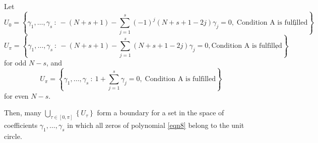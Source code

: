 \documentclass[12pt]{article}
\newcommand{\br}[1]{\left[#1\right]}
\newcommand{\cb}[1]{\left\{#1\right\}}
\begin{document}
Let
\begin{displaymath}
U_0 = \cb{\gamma_1,\ldots,\gamma_s \ : \ -(N + s + 1) - \sum_{j = 1}^{s}(-1)^j(N + s + 1 - 2j)\gamma_j = 0,\; \mbox{Condition A is fulfilled}},
\end{displaymath}
\begin{displaymath}
U_\pi = \cb{\gamma_1,\ldots,\gamma_s \ : \ -(N + s + 1) - \sum_{j = 1}^{s}(N + s + 1 - 2j)\gamma_j = 0, \mbox{Condition A is fulfilled}},
\end{displaymath}
for odd $N - s$, and
\begin{displaymath}
U_\pi = \cb{\gamma_1,\ldots,\gamma_s \ : \ 1 + \sum_{j = 1}^{s}\gamma_j = 0,\; \mbox{Condition A is fulfilled}}
\end{displaymath}
for even $N - s$.

Then, many $\displaystyle \bigcup_{\tau \in \br{0,\pi}} \cb{U_\tau}$ form a boundary for a set in the space of coefficients $\gamma_1, \ldots, \gamma_s$ in which all zeros of polynomial \eqref{eqn8} belong to the unit circle.
\end{document}
